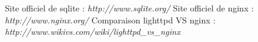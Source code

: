 \documentclass[10pt,a4paper]{article}
\begin{document}

\begin{thebibliography}{10}
    Site officiel de sqlite : \emph{http://www.sqlite.org/}
    Site officiel de nginx : \emph{http://www.nginx.org/}
    Comparaison lighttpd VS nginx :  \emph{http://www.wikivs.com/wiki/lighttpd\_vs\_nginx}
\end{thebibliography}
\end{document}
